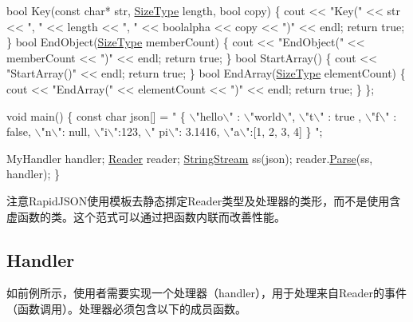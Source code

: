 \begin{DoxyCode}
    \textcolor{keywordtype}{bool} Key(\textcolor{keyword}{const} \textcolor{keywordtype}{char}* str, \hyperlink{rapidjson_8h_a5ed6e6e67250fadbd041127e6386dcb5}{SizeType} length, \textcolor{keywordtype}{bool} copy) \{ 
        cout << \textcolor{stringliteral}{"Key("} << str << \textcolor{stringliteral}{", "} << length << \textcolor{stringliteral}{", "} << boolalpha << copy << \textcolor{stringliteral}{")"} << endl;
        \textcolor{keywordflow}{return} \textcolor{keyword}{true};
    \}
    \textcolor{keywordtype}{bool} EndObject(\hyperlink{rapidjson_8h_a5ed6e6e67250fadbd041127e6386dcb5}{SizeType} memberCount) \{ cout << \textcolor{stringliteral}{"EndObject("} << memberCount << \textcolor{stringliteral}{")"} << endl; \textcolor{keywordflow}{
      return} \textcolor{keyword}{true}; \}
    \textcolor{keywordtype}{bool} StartArray() \{ cout << \textcolor{stringliteral}{"StartArray()"} << endl; \textcolor{keywordflow}{return} \textcolor{keyword}{true}; \}
    \textcolor{keywordtype}{bool} EndArray(\hyperlink{rapidjson_8h_a5ed6e6e67250fadbd041127e6386dcb5}{SizeType} elementCount) \{ cout << \textcolor{stringliteral}{"EndArray("} << elementCount << \textcolor{stringliteral}{")"} << endl; \textcolor{keywordflow}{
      return} \textcolor{keyword}{true}; \}
\};

\textcolor{keywordtype}{void} main() \{
    \textcolor{keyword}{const} \textcolor{keywordtype}{char} json[] = \textcolor{stringliteral}{" \{ \(\backslash\)"hello\(\backslash\)" : \(\backslash\)"world\(\backslash\)", \(\backslash\)"t\(\backslash\)" : true , \(\backslash\)"f\(\backslash\)" : false, \(\backslash\)"n\(\backslash\)": null, \(\backslash\)"i\(\backslash\)":123, \(\backslash\)"
      pi\(\backslash\)": 3.1416, \(\backslash\)"a\(\backslash\)":[1, 2, 3, 4] \} "};

    MyHandler handler;
    \hyperlink{class_generic_reader}{Reader} reader;
    \hyperlink{struct_generic_string_stream}{StringStream} ss(json);
    reader.\hyperlink{class_generic_reader_a0c450620d14ff1824e58bb7bd9b42099}{Parse}(ss, handler);
\}
\end{DoxyCode}


注意\+Rapid\+J\+S\+O\+N使用模板去静态挷定{\ttfamily Reader}类型及处理器的类形，而不是使用含虚函数的类。这个范式可以通过把函数内联而改善性能。\hypertarget{md_Cadriciel_Commun_Externe_RapidJSON_doc_sax.zh-cn_Handler}{}\subsection{Handler}\label{md_Cadriciel_Commun_Externe_RapidJSON_doc_sax.zh-cn_Handler}
如前例所示，使用者需要实现一个处理器（handler），用于处理来自{\ttfamily Reader}的事件（函数调用）。处理器必须包含以下的成员函数。


